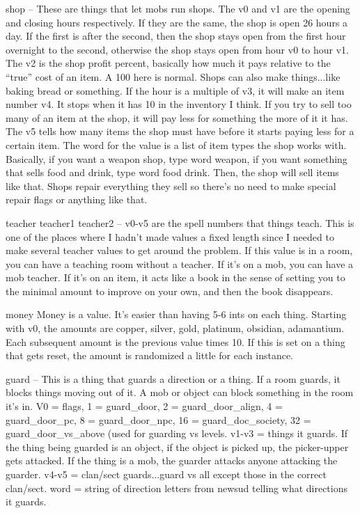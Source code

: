 \bul shop -- These are things that let mobs run shops. The v0 and v1
are the opening and closing hours respectively. If they are the same,
the shop is open 26 hours a day. If the first is after the second,
then the shop stays open from the first hour overnight to the second,
otherwise the shop stays open from hour v0 to hour v1. The v2 is the
shop profit percent, basically how much it pays relative to the
``true'' cost of an item. A 100 here is normal. Shops can also make
things...like baking bread or something. If the hour is a multiple of
v3, it will make an item number v4. It stops when it has 10 in the
inventory I think. If you try to sell too many of an item at the shop,
it will pay less for something the more of it it has. The v5 tells how
many items the shop must have before it starts paying less for a
certain item. The word for the value is a list of item types the shop
works with. Basically, if you want a weapon shop, type word weapon, if
you want something that sells food and drink, type word food
drink. Then, the shop will sell items like that. Shops repair
everything they sell so there's no need to make special repair flags
or anything like that.

\bul teacher teacher1 teacher2 -- v0-v5 are the spell numbers that
things teach. This is one of the places where I hadn't made values a
fixed length since I needed to make several teacher values to get
around the problem. If this value is in a room, you can have a
teaching room without a teacher. If it's on a mob, you can have a mob
teacher. If it's on an item, it acts like a book in the sense of
setting you to the minimal amount to improve on your own, and then the
book disappears.

\bul money Money is a value. It's easier than having 5-6 ints on each
thing. Starting with v0, the amounts are copper, silver, gold,
platinum, obsidian, adamantium. Each subsequent amount is the previous
value times 10. If this is set on a thing that gets reset, the amount
is randomized a little for each instance.

\bul guard -- This is a thing that guards a direction or a thing. If a
room guards, it blocks things moving out of it. A mob or object can
block something in the room it's in. V0 = flags, 1 = guard\_door, 2 =
guard\_door\_align, 4 = guard\_door\_pc, 8 = guard\_door\_npc, 16 =
guard\_doc\_society, 32 = guard\_door\_vs\_above (used for guarding vs
levels. v1-v3 = things it guards. If the thing being guarded is an
object, if the object is picked up, the picker-upper gets attacked. If
the thing is a mob, the guarder attacks anyone attacking the
guarder. v4-v5 = clan/sect guards...guard vs all except those in the
correct clan/sect. word = string of direction letters from newsud
telling what directions it guards.

